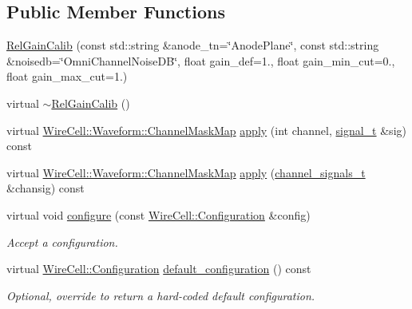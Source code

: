 \subsection*{Public Member Functions}
\begin{DoxyCompactItemize}
\item 
\hyperlink{class_wire_cell_1_1_sig_proc_1_1_protodune_1_1_rel_gain_calib_ab351f21e79d1840aae5d4aada1b27eb2}{Rel\+Gain\+Calib} (const std\+::string \&anode\+\_\+tn=\char`\"{}Anode\+Plane\char`\"{}, const std\+::string \&noisedb=\char`\"{}Omni\+Channel\+Noise\+DB\char`\"{}, float gain\+\_\+def=1., float gain\+\_\+min\+\_\+cut=0., float gain\+\_\+max\+\_\+cut=1.)
\item 
virtual \hyperlink{class_wire_cell_1_1_sig_proc_1_1_protodune_1_1_rel_gain_calib_a17e962e4eaf3be393f58568bf2c572c8}{$\sim$\+Rel\+Gain\+Calib} ()
\item 
virtual \hyperlink{namespace_wire_cell_1_1_waveform_a18b9ae61c858e340252ba3ac83ac3bc0}{Wire\+Cell\+::\+Waveform\+::\+Channel\+Mask\+Map} \hyperlink{class_wire_cell_1_1_sig_proc_1_1_protodune_1_1_rel_gain_calib_ae841532dd723111810c797fb13e0df3a}{apply} (int channel, \hyperlink{class_wire_cell_1_1_i_channel_filter_a434ed96cc4b805fa0eeec14f9f8d85e9}{signal\+\_\+t} \&sig) const
\item 
virtual \hyperlink{namespace_wire_cell_1_1_waveform_a18b9ae61c858e340252ba3ac83ac3bc0}{Wire\+Cell\+::\+Waveform\+::\+Channel\+Mask\+Map} \hyperlink{class_wire_cell_1_1_sig_proc_1_1_protodune_1_1_rel_gain_calib_afa25d6774f5ea8bf33ba28494ef2a0f4}{apply} (\hyperlink{class_wire_cell_1_1_i_channel_filter_a44de35ce47701d84cd45393c6bcd5e2f}{channel\+\_\+signals\+\_\+t} \&chansig) const
\item 
virtual void \hyperlink{class_wire_cell_1_1_sig_proc_1_1_protodune_1_1_rel_gain_calib_a99b012e241dee5e126200eec679c80b0}{configure} (const \hyperlink{namespace_wire_cell_a9f705541fc1d46c608b3d32c182333ee}{Wire\+Cell\+::\+Configuration} \&config)
\begin{DoxyCompactList}\small\item\em Accept a configuration. \end{DoxyCompactList}\item 
virtual \hyperlink{namespace_wire_cell_a9f705541fc1d46c608b3d32c182333ee}{Wire\+Cell\+::\+Configuration} \hyperlink{class_wire_cell_1_1_sig_proc_1_1_protodune_1_1_rel_gain_calib_a6f8513628170ebea7b8741ad12d9f3a1}{default\+\_\+configuration} () const
\begin{DoxyCompactList}\small\item\em Optional, override to return a hard-\/coded default configuration. \end{DoxyCompactList}\end{DoxyCompactItemize}
